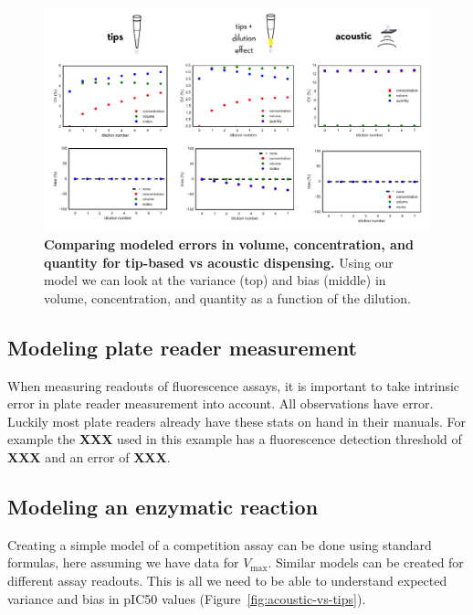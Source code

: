 \documentclass[aps,pre,twocolumn,nofootinbib,superscriptaddress,linenumbers]{revtex4-1}
\begin{document}
\begin{figure}[tb]
    \includegraphics[width=1.0\textwidth]{../figures/volumes-n-concentrations.pdf}

  \caption{{\bf Comparing modeled errors in volume, concentration, and quantity for tip-based vs acoustic dispensing.}
  Using our model we can look at the variance (top) and bias (middle) in volume, concentration, and quantity as a function of the dilution.
  }
  \label{fig:volumes-n-concentrations}
\end{figure}


\subsection*{Modeling plate reader measurement}

When measuring readouts of fluorescence assays, it is important to take intrinsic error in plate reader measurement into account. All observations have error. 
Luckily most plate readers already have these stats on hand in their manuals. 
For example the {\bf XXX} used in this example has a fluorescence detection threshold of {\bf XXX} and an error of {\bf XXX}.

\subsection*{Modeling an enzymatic reaction}

Creating a simple model of a competition assay can be done using standard formulas, here assuming we have data for $V_\mathrm{max}$. 
Similar models can be created for different assay readouts.  This is all we need to be able to understand expected variance and bias in  pIC50 values (Figure~\ref{fig:acoustic-vs-tips}).
\end{document}
